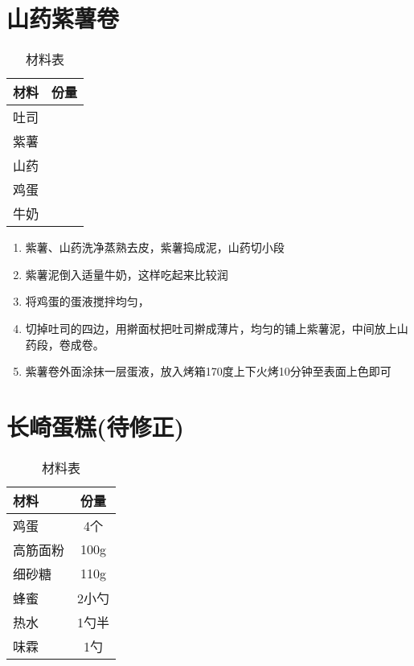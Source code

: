 \section{山药紫薯卷}

\begin{table}[H]
    \centering
    \begin{tabular}{|l||c|}\hline
     \textbf{材料}    &  \textbf{份量}\\ \hline\hline
    吐司 &  \\ \hline
    紫薯 &  \\ \hline
    山药 &  \\ \hline
    鸡蛋 &  \\ \hline
    牛奶 & \\ \hline
    \end{tabular}
    \caption{材料表}
\end{table}

\begin{enumerate}
    \item 紫薯、山药洗净蒸熟去皮，紫薯捣成泥，山药切小段
    \item 紫薯泥倒入适量牛奶，这样吃起来比较润
    \item 将鸡蛋的蛋液搅拌均匀，
    \item 切掉吐司的四边，用擀面杖把吐司擀成薄片，均匀的铺上紫薯泥，中间放上山药段，卷成卷。
    \item 紫薯卷外面涂抹一层蛋液，放入烤箱170度上下火烤10分钟至表面上色即可
\end{enumerate}


\section{长崎蛋糕(待修正)}

\begin{table}[H]
    \centering
    \begin{tabular}{|l||c|}\hline
     \textbf{材料}    &  \textbf{份量}\\ \hline\hline
    鸡蛋 & 4个 \\ \hline
    高筋面粉 & 100g \\ \hline
    细砂糖 &  110g \\ \hline
    蜂蜜 & 2小勺 \\ \hline
    热水 & 1勺半\\ \hline
    味霖 & 1勺\\ \hline
    \end{tabular}
    \caption{材料表}
\end{table}

